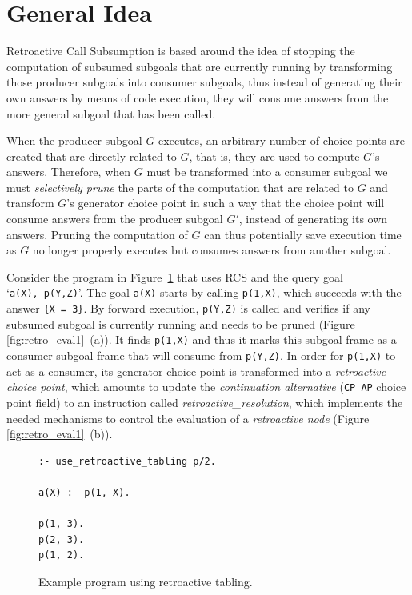 \section{General Idea}

Retroactive Call Subsumption is based around the idea of stopping the computation of subsumed subgoals
that are currently running by transforming those producer subgoals into consumer subgoals, thus instead
of generating their own answers by means of code execution, they will consume answers from the more general
subgoal that has been called.

When the producer subgoal $G$ executes, an arbitrary number of choice points are created that are directly related
to $G$, that is, they are used to compute $G$'s answers. Therefore, when $G$
must be transformed into a consumer subgoal we must \textit{selectively prune} the parts of the computation
that are related to $G$ and transform $G$'s generator choice point in such a way that the choice point
will consume answers from the producer subgoal $G'$, instead of generating its own answers.
Pruning the computation of $G$ can thus potentially save execution time as $G$ no longer properly executes
but consumes answers from another subgoal.

Consider the program in Figure~\ref{fig:retro_program1} that uses RCS and the query goal `\texttt{a(X),~p(Y,Z)}'.
The goal \texttt{a(X)} starts by calling \texttt{p(1,X)}, which succeeds with the answer \texttt{\{X~=~3\}}.
By forward execution, \texttt{p(Y,Z)} is called and verifies if any subsumed subgoal is currently running
and needs to be pruned (Figure \ref{fig:retro_eval1}~(a)). It finds \texttt{p(1,X)} and thus it marks this subgoal frame as a consumer subgoal
frame that will consume from \texttt{p(Y,Z)}.
In order for \texttt{p(1,X)} to act as a consumer, its generator choice point is transformed into
a \textit{retroactive choice point}, which amounts to update the \textit{continuation alternative}
(\texttt{CP\_AP} choice point field) to an instruction called \textit{retroactive\_resolution},
which implements the needed mechanisms to control the evaluation of a \textit{retroactive node}
(Figure \ref{fig:retro_eval1}~(b)).

\begin{figure}[ht]
\begin{Verbatim}
:- use_retroactive_tabling p/2.

a(X) :- p(1, X).

p(1, 3).
p(2, 3).
p(1, 2).
\end{Verbatim}
\caption{Example program using retroactive tabling.}
\label{fig:retro_program1}
\end{figure}

